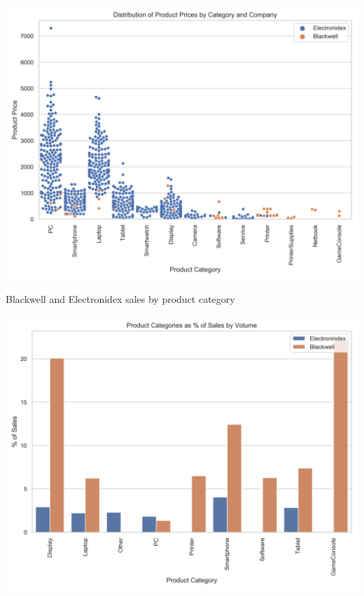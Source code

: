 \documentclass[12pt,a4paper,leqno]{report}
\theoremstyle{plain}
\theoremstyle{definition}
\theoremstyle{remark}
\begin{document}
\bigskip
{
    \centering
    \includegraphics[width=\textwidth,height=\textheight,keepaspectratio]{product_prices_distribution_by_category_and_company.png}
    \par
}
\bigskip

Blackwell and Electronidex sales by product category

\bigskip
{
    \centering
    \includegraphics[width=\textwidth,height=\textheight,keepaspectratio]{sales_distribution_of_product_categories_by_volume_no_accessories.png}
    \par
}
\bigskip
\end{document}
